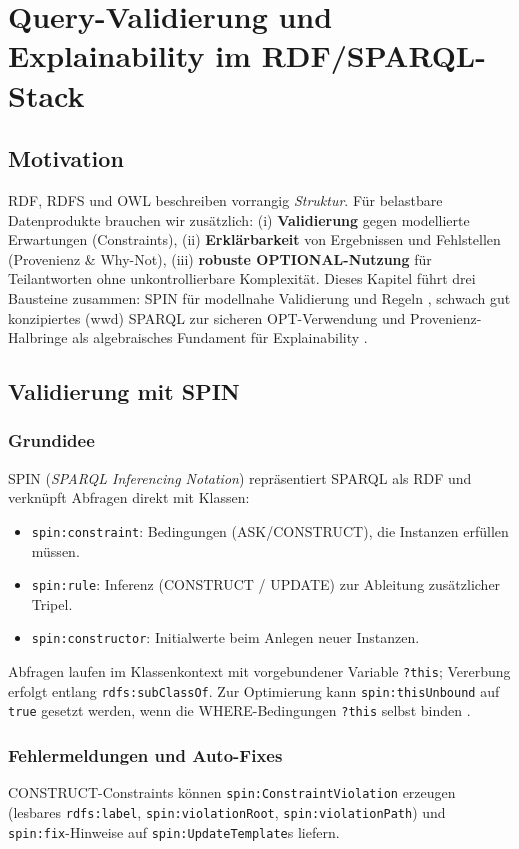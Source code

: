 \section{Query-Validierung und Explainability im RDF/SPARQL-Stack}
\label{chap:Query-validation-explainability}

\subsection{Motivation}
RDF, RDFS und OWL beschreiben vorrangig \emph{Struktur}. Für belastbare Datenprodukte brauchen wir zusätzlich:
(i) \textbf{Validierung} gegen modellierte Erwartungen (Constraints),
(ii) \textbf{Erklärbarkeit} von Ergebnissen und Fehlstellen (Provenienz \& Why-Not),
(iii) \textbf{robuste OPTIONAL-Nutzung} für Teilantworten ohne unkontrollierbare Komplexität.
Dieses Kapitel führt drei Bausteine zusammen: SPIN für modellnahe Validierung und Regeln \cite{spin-w3c}, schwach gut konzipiertes (wwd) SPARQL zur sicheren OPT-Verwendung \cite{kaminski-kostylev-beyond-well-designed} und Provenienz-Halbringe als algebraisches Fundament für Explainability \cite{green-provenance-semirings,herschel-why-why-not,herschel-survey}.

\subsection{Validierung mit SPIN}
\subsubsection{Grundidee}
SPIN (\emph{SPARQL Inferencing Notation}) repräsentiert SPARQL als RDF und verknüpft Abfragen direkt mit Klassen:
\begin{itemize}
  \item \texttt{spin:constraint}: Bedingungen (ASK/CONSTRUCT), die Instanzen erfüllen müssen.
  \item \texttt{spin:rule}: Inferenz (CONSTRUCT / UPDATE) zur Ableitung zusätzlicher Tripel.
  \item \texttt{spin:constructor}: Initialwerte beim Anlegen neuer Instanzen.
\end{itemize}
Abfragen laufen im Klassenkontext mit vorgebundener Variable \texttt{?this}; Vererbung erfolgt entlang \texttt{rdfs:subClassOf}. Zur Optimierung kann \texttt{spin:thisUnbound} auf \texttt{true} gesetzt werden, wenn die WHERE-Bedingungen \texttt{?this} selbst binden \cite{spin-w3c}.

\subsubsection{Fehlermeldungen und Auto-Fixes}
CONSTRUCT-Constraints können \texttt{spin:ConstraintViolation} erzeugen (lesbares \texttt{rdfs:label}, \texttt{spin:violationRoot}, \texttt{spin:violationPath}) und \texttt{spin:fix}-Hinweise auf \texttt{spin:UpdateTemplate}s liefern.

